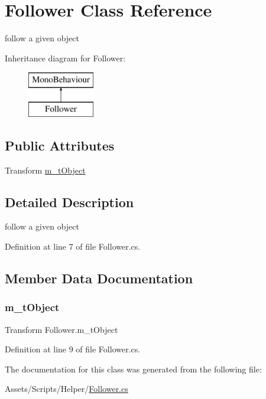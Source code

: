 \hypertarget{class_follower}{}\section{Follower Class Reference}
\label{class_follower}


follow a given object  


Inheritance diagram for Follower\+:\begin{figure}[H]
\begin{center}
\leavevmode
\includegraphics[height=2.000000cm]{class_follower}
\end{center}
\end{figure}
\subsection*{Public Attributes}
\begin{DoxyCompactItemize}
\item 
Transform \mbox{\hyperlink{class_follower_ac84b2f2319db3dfd3a44d5dce21b058d}{m\+\_\+t\+Object}}
\end{DoxyCompactItemize}


\subsection{Detailed Description}
follow a given object 



Definition at line 7 of file Follower.\+cs.



\subsection{Member Data Documentation}
\mbox{\label{class_follower_ac84b2f2319db3dfd3a44d5dce21b058d}} 
\subsubsection{\texorpdfstring{m\+\_\+t\+Object}{m\_tObject}}
{\footnotesize\ttfamily Transform Follower.\+m\+\_\+t\+Object}



Definition at line 9 of file Follower.\+cs.



The documentation for this class was generated from the following file\+:\begin{DoxyCompactItemize}
\item 
Assets/\+Scripts/\+Helper/\mbox{\hyperlink{_follower_8cs}{Follower.\+cs}}\end{DoxyCompactItemize}
